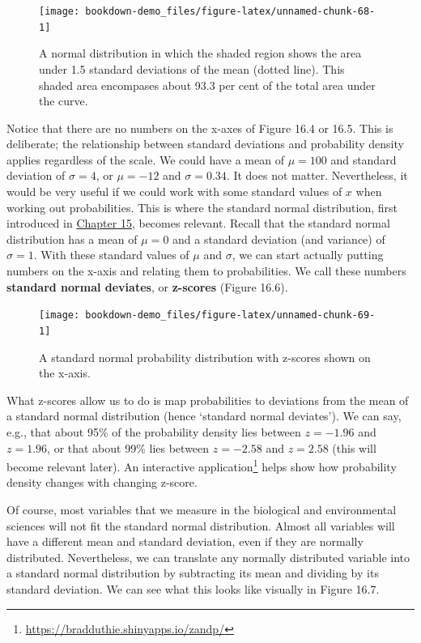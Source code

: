 \documentclass[
]{scrbook}
\begin{document}
\begin{figure}
\texttt{[image: bookdown-demo\_files/figure-latex/unnamed-chunk-68-1]} \caption{A normal distribution in which the shaded region shows the area under 1.5 standard deviations of the mean (dotted line). This shaded area encompases about 93.3 per cent of the total area under the curve.}\label{fig:unnamed-chunk-68}
\end{figure}

Notice that there are no numbers on the x-axes of Figure 16.4 or 16.5.
This is deliberate; the relationship between standard deviations and probability density applies regardless of the scale.
We could have a mean of \(\mu = 100\) and standard deviation of \(\sigma = 4\), or \(\mu = -12\) and \(\sigma = 0.34\).
It does not matter.
Nevertheless, it would be very useful if we could work with some standard values of \(x\) when working out probabilities.
This is where the standard normal distribution, first introduced in \protect\hyperlink{Chapter_15}{Chapter 15}, becomes relevant.
Recall that the standard normal distribution has a mean of \(\mu = 0\) and a standard deviation (and variance) of \(\sigma = 1\).
With these standard values of \(\mu\) and \(\sigma\), we can start actually putting numbers on the x-axis and relating them to probabilities.
We call these numbers \textbf{standard normal deviates}, or \textbf{z-scores} (Figure 16.6).

\begin{figure}
\texttt{[image: bookdown-demo\_files/figure-latex/unnamed-chunk-69-1]} \caption{A standard normal probability distribution with z-scores shown on the x-axis.}\label{fig:unnamed-chunk-69}
\end{figure}

What z-scores allow us to do is map probabilities to deviations from the mean of a standard normal distribution (hence `standard normal deviates').
We can say, e.g., that about 95\% of the probability density lies between \(z = -1.96\) and \(z = 1.96\), or that about 99\% lies between \(z = -2.58\) and \(z = 2.58\) (this will become relevant later).
An interactive application\footnote{\url{https://bradduthie.shinyapps.io/zandp/}} helps show how probability density changes with changing z-score.

Of course, most variables that we measure in the biological and environmental sciences will not fit the standard normal distribution.
Almost all variables will have a different mean and standard deviation, even if they are normally distributed.
Nevertheless, we can translate any normally distributed variable into a standard normal distribution by subtracting its mean and dividing by its standard deviation.
We can see what this looks like visually in Figure 16.7.
\end{document}
